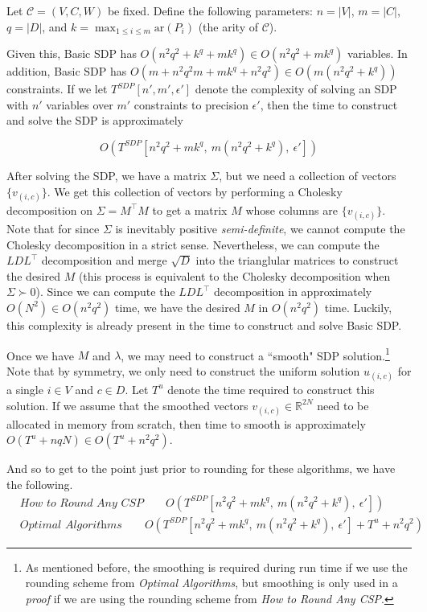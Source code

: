 \documentclass[letterpaper, 12pt]{article}
\numberwithin{equation}{section}
\begin{document}
Let $\mathcal{C} = (V,C,W)$ be fixed. Define the following parameters: $n = |V|$, $m = |C|$, $q = |D|$, and $ k = \max_{1\leq i \leq m}\text{ar}(P_i)$ (the arity of $\mathcal{C}$).

Given this, Basic SDP has $O(n^2q^2 + k^q + mk^q) \in O(n^2q^2 + mk^q)$ variables. In addition, Basic SDP has $O(m + n^2q^2m + mk^q + n^2q^2) \in O(m (n^2q^2 + k^q))$ constraints. If we let $T^{SDP}\left[{n',m',\epsilon'}\right]$ denote the complexity of solving an SDP with $n'$ variables over $m'$ constraints to precision $\epsilon'$, then the time to construct and solve the SDP is approximately

\begin{equation}
O( T^{SDP}\left[n^2q^2 + mk^q,~ m (n^2q^2 + k^q),~\epsilon'\right])
\end{equation}

After solving the SDP, we have a matrix $\Sigma$, but we need a collection of vectors $\{v_{(i,c)}\}$. We get this collection of vectors by performing a Cholesky decomposition on $\Sigma = M^\intercal M$ to get a matrix $M$ whose columns are $\{v_{(i,c)}\}$. Note that for since $\Sigma$ is inevitably positive \textit{semi-definite}, we cannot compute the Cholesky decomposition in a strict sense. Nevertheless, we can compute the $LDL^\intercal$ decomposition and merge $\sqrt{D}$ into the trianglular matrices to construct the desired $M$ (this process is equivalent to the Cholesky decomposition when $\Sigma \succ 0$). Since we can compute the $LDL^\intercal$ decomposition in approximately $O(N^2) \in O(n^2q^2)$ time, we have the desired $M$ in $O(n^2q^2)$ time. Luckily, this complexity is already present in the time to construct and solve Basic SDP.


Once we have $M$ and $\lambda$, we may need to construct a ``smooth" SDP solution.\footnote{As mentioned before, the smoothing is required during run time if we use the rounding scheme from \textit{Optimal Algorithms}, but smoothing is only used in a \textit{proof} if we are using the rounding scheme from \textit{How to Round Any CSP}.}  Note that by symmetry, we only need to construct the uniform solution $u_{(i,c)}$ for a single $i \in V$ and $c \in D$. Let $T^u$ denote the time required to construct this solution. If we assume that the smoothed vectors $v_{(i,c)} \in \mathbb{R}^{2N}$ need to be allocated in memory from scratch, then time to smooth is approximately $O(T^u + nq N) \in O(T^u + n^2q^2)$.

And so to get to the point just prior to rounding for these algorithms, we have the following.
\begin{align}
&\textit{How to Round Any CSP} \qquad O( T^{SDP}\left[n^2q^2 + mk^q,~ m (n^2q^2 + k^q),~\epsilon'\right])  \\
&\textit{Optimal Algorithms} \qquad O( T^{SDP}\left[n^2q^2 + mk^q,~ m (n^2q^2 + k^q),~\epsilon'\right] + T^u + n^2q^2)
\end{align} 
\end{document}
